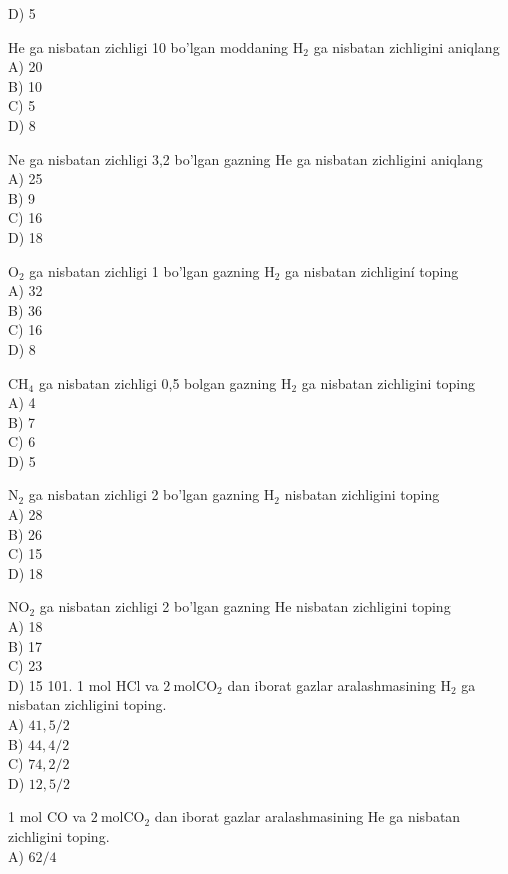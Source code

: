 D) 5
  \item He ga nisbatan zichligi 10 bo'lgan moddaning $\mathrm{H}_{2}$ ga nisbatan zichligini aniqlang\\
A) 20\\
B) 10\\
C) 5\\
D) 8
  \item Ne ga nisbatan zichligi 3,2 bo'lgan gazning He ga nisbatan zichligini aniqlang\\
A) 25\\
B) 9\\
C) 16\\
D) 18
  \item $\mathrm{O}_{2}$ ga nisbatan zichligi 1 bo'lgan gazning $\mathrm{H}_{2}$ ga nisbatan zichliginí toping\\
A) 32\\
B) 36\\
C) 16\\
D) 8
  \item $\mathrm{CH}_{4}$ ga nisbatan zichligi 0,5 bolgan gazning $\mathrm{H}_{2}$ ga nisbatan zichligini toping\\
A) 4\\
B) 7\\
C) 6\\
D) 5
  \item $\mathrm{N}_{2}$ ga nisbatan zichligi 2 bo'lgan gazning $\mathrm{H}_{2}$ nisbatan zichligini toping\\
A) 28\\
B) 26\\
C) 15\\
D) 18
  \item $\mathrm{NO}_{2}$ ga nisbatan zichligi 2 bo'lgan gazning He nisbatan zichligini toping\\
A) 18\\
B) 17\\
C) 23\\
D) 15
101. 1 mol HCl va $2 \mathrm{~mol} \mathrm{CO}_{2}$ dan iborat gazlar aralashmasining $\mathrm{H}_{2}$ ga nisbatan zichligini toping.\\
A) $41,5 / 2$\\
B) $44,4 / 2$\\
C) $74,2 / 2$\\
D) $12,5 / 2$
  \item 1 mol CO va $2 \mathrm{~mol} \mathrm{CO}_{2}$ dan iborat gazlar aralashmasining He ga nisbatan zichligini toping.\\
A) $62 / 4$\\

